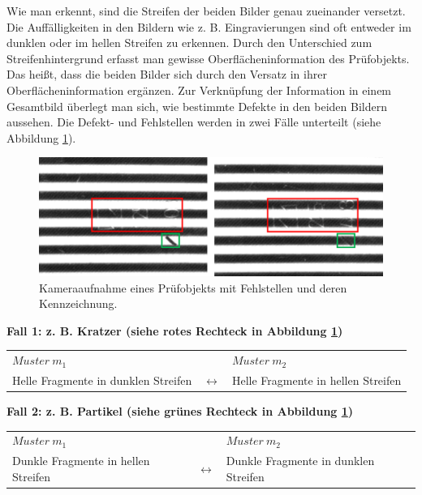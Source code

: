 \noindent
Wie man erkennt, sind die Streifen der beiden Bilder genau zueinander versetzt.
Die Auffälligkeiten in den Bildern wie z. B. Eingravierungen sind oft entweder im dunklen oder im hellen Streifen zu erkennen.
Durch den Unterschied zum Streifenhintergrund erfasst man gewisse Oberflächeninformation des Prüfobjekts.
Das heißt, dass die beiden Bilder sich durch den Versatz in ihrer Oberflächeninformation ergänzen.
Zur Verknüpfung der Information in einem Gesamtbild überlegt man sich, wie bestimmte Defekte in den beiden Bildern aussehen.
Die Defekt- und Fehlstellen werden in zwei Fälle unterteilt (siehe Abbildung \ref{img:imageToLinkWithMarkings}).

\begin{figure}[H]
	\centering
	\includegraphics[width=\textwidth]{03_sichtpruefungDurchLichtstreuung/einsatzVonMehrerenStreifenmustern/figures/imageToLinkWithMarkings}
	\caption[Markierte Fehlstellen]{Kameraaufnahme eines Prüfobjekts mit Fehlstellen und deren Kennzeichnung.}
	\label{img:imageToLinkWithMarkings}
\end{figure}

\noindent
\textbf{Fall 1: z. B. Kratzer (siehe rotes Rechteck in Abbildung \ref{img:imageToLinkWithMarkings})}
\nopagebreak
\par\medskip\noindent
\begin{tabular}{@{} p{} c p{} @{}}
$Muster ~m_1$ &  & $Muster ~m_2$ \\ 
	Helle Fragmente in dunklen Streifen & $ \longleftrightarrow $ & Helle Fragmente in hellen Streifen \\ 
\end{tabular}

\p
\textbf{Fall 2: z. B. Partikel (siehe grünes Rechteck in Abbildung \ref{img:imageToLinkWithMarkings})}
\nopagebreak
\par\medskip\noindent
\begin{tabular}{@{} p{} c p{} @{}}
	$Muster ~m_1$ &  & $Muster ~m_2$ \\ 
	Dunkle Fragmente in hellen Streifen & $ \longleftrightarrow $ & Dunkle Fragmente in dunklen Streifen \\ 
\end{tabular}

